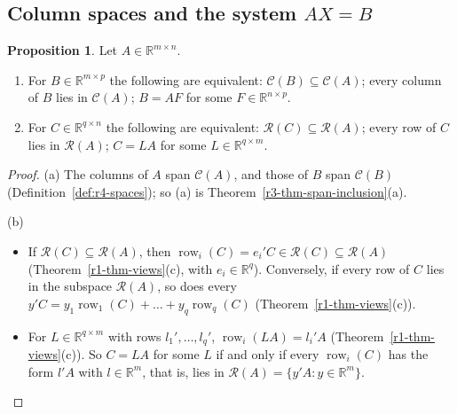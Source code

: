 \documentclass[12pt]{article}
\newcommand{\R}{\mathbb R}
\DeclareMathOperator{\row}{row}
\theoremstyle{definition}
\newtheorem{proposition}[theorem]{Proposition}
\begin{document}
\subsection*{Column spaces and the system \(AX=B\)}

\begin{proposition}\label{prop:r4-inclusion}
Let \(A\in\R^{m\times n}\).
\begin{enumerate}
\item For \(B\in\R^{m\times p}\) the following are equivalent: \(\mathcal C(B)\subseteq\mathcal C(A)\); every column
of \(B\) lies in \(\mathcal C(A)\); \(B=AF\) for some \(F\in\R^{n\times p}\).
\item For \(C\in\R^{q\times n}\) the following are equivalent: \(\mathcal R(C)\subseteq\mathcal R(A)\); every row of
\(C\) lies in \(\mathcal R(A)\); \(C=LA\) for some \(L\in\R^{q\times m}\).
\end{enumerate}
\end{proposition}
\begin{proof}
(a) The columns of \(A\) span \(\mathcal C(A)\), and those of \(B\) span \(\mathcal C(B)\)
(Definition~\ref{def:r4-spaces}); so (a) is Theorem~\ref{r3-thm-span-inclusion}(a).

(b)
\begin{itemize}
\item If \(\mathcal R(C)\subseteq\mathcal R(A)\), then \(\row_i(C)=e_i'C\in\mathcal R(C)\subseteq\mathcal R(A)\)
(Theorem~\ref{r1-thm-views}(c), with \(e_i\in\R^q\)). Conversely, if every row of \(C\) lies in the subspace
\(\mathcal R(A)\), so does every \(y'C=y_1\row_1(C)+\dots+y_q\row_q(C)\) (Theorem~\ref{r1-thm-views}(c)).
\item For \(L\in\R^{q\times m}\) with rows \(l_1',\dots,l_q'\), \(\row_i(LA)=l_i'A\)
(Theorem~\ref{r1-thm-views}(c)). So \(C=LA\) for some \(L\) if and only if every \(\row_i(C)\) has the form \(l'A\)
with \(l\in\R^m\), that is, lies in \(\mathcal R(A)=\{y'A:y\in\R^m\}\).\qedhere
\end{itemize}
\end{proof}
\end{document}
